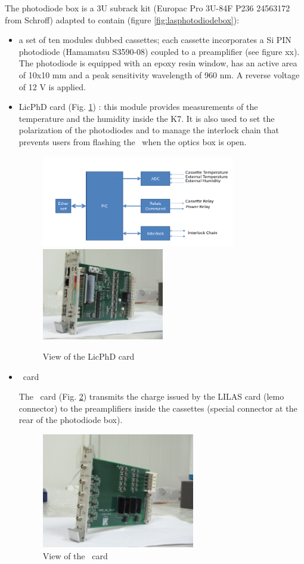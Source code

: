 The photodiode box is a 3U subrack kit (Europac Pro 3U-84F P236 24563172 from Schroff) adapted to contain (figure \ref{fig:lasphotodiodebox}):
\begin{itemize}
\item a set of ten modules dubbed cassettes; each cassette incorporates a Si PIN photodiode (Hamamatsu S3590-08) coupled to a preamplifier (see figure xx). The photodiode is equipped with an epoxy resin window, has an active area of 10x10 mm and a peak sensitivity wavelength of 960 nm. A reverse voltage of 12 V is applied.
\item LicPhD card (Fig. \ref{fig:laslicphd}) : this module provides measurements of  the temperature and the humidity inside the K7. It is also used to set the polarization of the photodiodes and to
manage the interlock chain that prevents users from flashing the \laser~when the optics box is open.

\begin{figure}[htbp]
\centering
\includegraphics[height=4cm]{figures/licphd_scheme.pdf}
\includegraphics[height=4cm]{figures/licphd.JPG}
\caption{View of the LicPhD card}\label{fig:laslicphd}
\end{figure}

\item \charinjsplit~card

The \charinjsplit~card (Fig. \ref{fig:lascis}) transmits the charge issued by the LILAS card (lemo connector) to the preamplifiers inside the cassettes (special connector at the rear of the photodiode box). 
\begin{figure}[htbp]
\centering
\includegraphics[height=5cm]{figures/cis.JPG}
\caption{View of the  \charinjsplit~card}\label{fig:lascis}
\end{figure}


\end{itemize}
